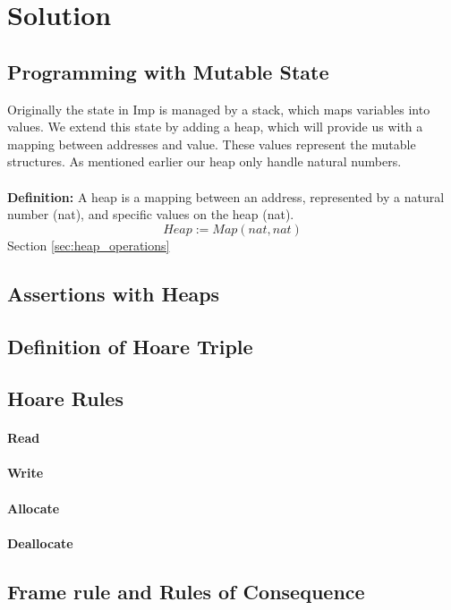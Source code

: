 \section{Solution}
\subsection{Programming with Mutable State}
Originally the state in Imp is managed by a stack, which maps variables into values. We extend this state by adding a heap, which will provide us with a mapping between addresses and value. These values represent the mutable structures. As mentioned earlier our heap only handle natural numbers.

\paragraph{}\textbf{Definition: }A heap is a mapping between an address, represented by a natural number (nat), and specific values on the heap (nat).
\[
Heap := Map(nat, nat)
\]
Section \ref{sec:heap_operations}

\subsection{Assertions with Heaps}

\subsection{Definition of Hoare Triple}

\subsection{Hoare Rules}
\paragraph{Read}
\paragraph{Write}
\paragraph{Allocate}
\paragraph{Deallocate}
\subsection{Frame rule and Rules of Consequence}

